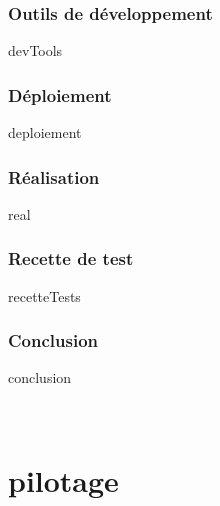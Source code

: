 \documentclass[a4paper, 12pt, titlepage, oneside, french]{article}
\begin{document}
\section{Outils de développement}
{devTools}
\newpage

\section{Déploiement}
{deploiement}
\newpage

\section{Réalisation}
{real}
\newpage

\section{Recette de test}
{recetteTests}
\newpage

\section{Conclusion}
{conclusion}
\newpage

\printglossary[title=Acronymes,type=\acronymtype]
\newpage 
\printglossary~\newpage 
\printbibliography~\newpage

\part{pilotage}


\newpage
\end{document}
